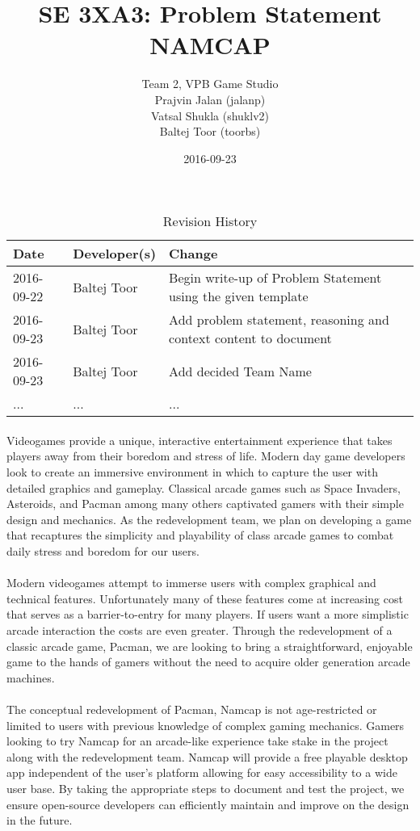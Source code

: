 \documentclass{article}
\title{SE 3XA3: Problem Statement\\NAMCAP}
\author{Team 2, VPB Game Studio
		\\ Prajvin Jalan (jalanp)
		\\ Vatsal Shukla (shuklv2)
		\\ Baltej Toor (toorbs)
}
\date{2016-09-23}
\begin{document}
\begin{table}[hp]
\caption{Revision History} \label{TblRevisionHistory}
\begin{tabularx}{\textwidth}{llX}
\toprule
\textbf{Date} & \textbf{Developer(s)} & \textbf{Change}\\
\midrule
2016-09-22 & Baltej Toor & Begin write-up of Problem Statement using the given
template\\
2016-09-23 & Baltej Toor & Add problem statement, reasoning and context content
to document\\
2016-09-23 & Baltej Toor & Add decided Team Name\\
... & ... & ...\\
\bottomrule
\end{tabularx}
\end{table}

\newpage

\maketitle

\paragraph{}
Videogames provide a unique, interactive entertainment experience that takes
players away from their boredom and stress of life. Modern day game developers
look to create an immersive environment in which to capture the user with
detailed graphics and gameplay. Classical arcade games such as Space Invaders,
Asteroids, and Pacman among many others captivated gamers with their simple
design and mechanics. As the redevelopment team, we plan on developing a game
that recaptures the simplicity and playability of class arcade games to combat
daily stress and boredom for our users.

\paragraph{}
Modern videogames attempt to immerse users with complex graphical and technical
features. Unfortunately many of these features come at increasing cost that
serves as a barrier-to-entry for many players. If users want a more simplistic
arcade interaction the costs are even greater. Through the redevelopment of a
classic arcade game, Pacman, we are looking to bring a straightforward,
enjoyable game to the hands of gamers without the need to acquire older
generation arcade machines.

\paragraph{}
The conceptual redevelopment of Pacman, Namcap is not age-restricted or limited
to users with previous knowledge of complex gaming mechanics. Gamers looking to
try Namcap for an arcade-like experience take stake in the project along with
the redevelopment team. Namcap will provide a free playable desktop app
independent of the user's platform allowing for easy accessibility to a wide
user base. By taking the appropriate steps to document and test the project, we
ensure open-source developers can efficiently maintain and improve on the design
in the future.
\end{document}
